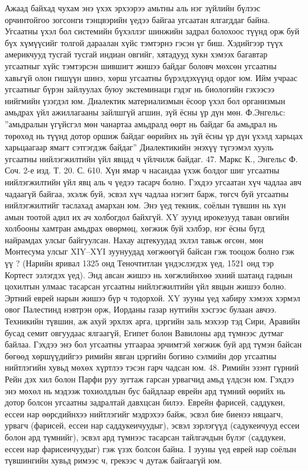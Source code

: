 Ажаад байхад чухам энэ үхэх эрхээрээ амьтны аль нэг зүйлийн бүлээс орчинтойгоо зогсонги тэнцвэрийн үедээ байгаа угсаатан ялгагддаг байна. Угсаатны үхэл бол системийн бүхэллэг шинжийн задрал болохоос түүнд орж буй бүх хүмүүсийг толгой дараалан хүйс тэмтэрнэ гэсэн үг биш. Хэдийгээр түүх америкчууд тусгай тусгай индиан овгийг, хятадууд хукн хэмээх багавтар угсаатныг хүйс тэмтэрсэн шившигт жишээ байдаг боловч мөхсөн угсаатны хавьгүй олон гишүүн шинэ, хөрш угсаатны бүрэлдэхүүнд ордог юм. Ийм учраас угсаатныг бүрэн зайлуулах буюу экстеминаци гэдэг нь биологийн гэхээсээ нийгмийн үзэгдэл юм.
Диалектик материализмын ёсоор үхэл бол организмын амьдрах үйл ажиллагааны зайлшгүй агшин, зүй ёсны үр дүн мөн. Ф.Энгельс: ”амьдралын үгүйсгэл мөн чанартаа амьдралд өөрт нь байдаг ба амьдрал нь төрөхөд нь түүнд дотор оршиж байдаг өөрийнх нь зүй ёсны үр дүн үхэлд харьцах харьцаагаар ямагт сэтгэгдэж байдаг” Диалектикийн энэхүү түгээмэл хууль угсаатны нийлэгжилтийн үйл явцад ч үйлчилж байдаг. 47. Маркс К., Энгельс Ф. Соч. 2-е изд. Т. 20. С. 610.
Хүн ямар ч насандаа үхэж болдог шиг угсаатны нийлэгжилтийн үйл явц аль ч үедээ тасарч болно. Гэхдээ угсаатан хүч чадлаа авч чадаагүй байгаа, эхэлж буй, эсвэл хүч чадлаа нэгэнт барж, төгсч буй угсаатны нийлэгжилтийг таслахад амархан юм. Энэ үед текник, соёлын түвшин нь хүн амын тоотой адил их ач холбогдол байхгүй. XY зуунд ирокезууд таван овгийн холбооны хамтран амьдрах өвөрмөц, хөгжиж буй хэлбэр, нэг ёсны бүгд найрамдах улсыг байгуулсан. Нахау ацтекуудад эхлэл тавьж өгсөн, мөн Монтесума улсыг XIY–XYI зуунуудад хөгжөөгүй байсан гэж тооцож болно гэж үү ? (Нарийн яривал 1325 онд Теночтитлан үндэслэгдэх үед, 1521 онд тэр Кортест эзлэгдэх үед). Энд авсан жишээ нь хөгжлийнхөө эхний шатанд гаднын цохилтын улмаас тасарсан угсаатны нийлэгжилтийн үйл явцын жишээ болно.
Эртний еврей нарын жишээ бүр ч тодорхой. XY зууны үед хабиру хэмээх хэрмэл овог Палестинд нэвтрэн орж, Иорданы газар нутгийн хэсгээс булаан авчээ. Техникийн түвшин, аж ахуй эрхлэх арга, цэргийн заль мэхээр тэд Сири, Аравийн бусад семит овгуудаас ялгаагүй, Египет болон Вавилоны ард түмнээс дутмаг байлаа. Гэхдээ энэ бол угсаатны утгаараа эрчимтэй хөгжиж буй ард түмэн байсан бөгөөд хөршүүдийгээ римийн явган цэргийн богино сэлмийн дор угсаатны нийтлэгийн хувьд мөхөх хүртлээ тэсэн гарч чадсан юм. 48. Римийн эзэнт гүрний Рейн дэх хил болон Парфи руу зугтаж гарсан урвагчид амьд үлдсэн юм.
Гэхдээ энэ мөхөл нь мэдээж тохиолдлын бус байдлаар еврейн ард түмний өөрийх нь дотор болсон угсаатны задралтай давхцсан билээ. Еврейн фарисей, саддукеи, ессеи нар өөрсдийнхээ нийтлэгийг мэдрэхээ байж, эсвэл бие биенээ няцаагч, урвагч (фарисей, ессеи нар саддукеичуудыг), эсвэл зэрлэгүүд (садукеичууд ессеи болон ард түмнийг), эсвэл ард түмнээс тасарсан тайлгачдын бүлэг (саддукеи, ессеи нар фарисеичуудыг) гэж үзэх болсон байна. I зууны үед еврей нар соёлын түвшингийн хувьд римээс ч, грекээс ч дутаж байгаагүй юм.
